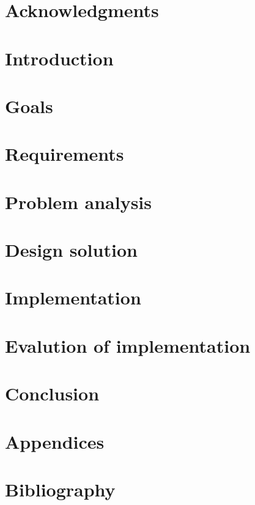 \documentclass{article}
\begin{document}

\clearpage

\section*{Acknowledgments}

\clearpage

\tableofcontents
\clearpage

\section{Introduction}

\clearpage

\section{Goals}

\clearpage

\section{Requirements}

\clearpage

\section{Problem analysis}

\clearpage

\section{Design solution}

\clearpage

\section{Implementation}

\clearpage

\section{Evalution of implementation}

\clearpage

\section{Conclusion}

\clearpage

\section{Appendices}

\clearpage

\section{Bibliography}

\clearpage
\end{document}
